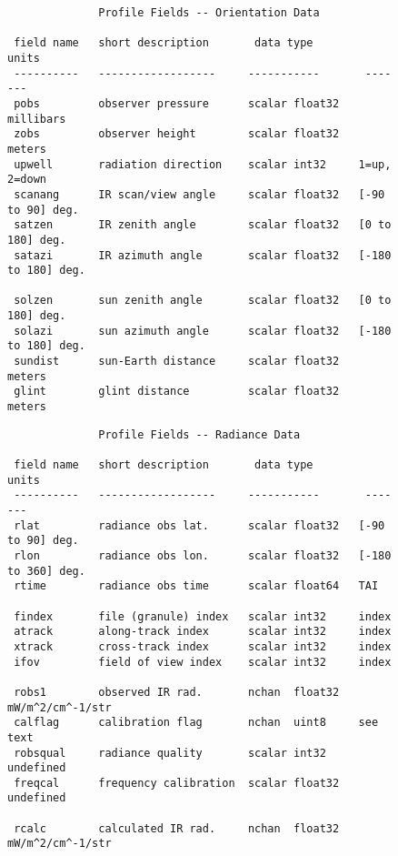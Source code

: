 \documentclass[11pt]{article}
\begin{document}
\begin{figure}
{\footnotesize
\begin{verbatim}
              Profile Fields -- Orientation Data
  
 field name   short description       data type         units
 ----------   ------------------     -----------       -------
 pobs         observer pressure      scalar float32   millibars
 zobs         observer height        scalar float32   meters
 upwell       radiation direction    scalar int32     1=up, 2=down
 scanang      IR scan/view angle     scalar float32   [-90 to 90] deg.
 satzen       IR zenith angle        scalar float32   [0 to 180] deg.
 satazi       IR azimuth angle       scalar float32   [-180 to 180] deg.

 solzen       sun zenith angle       scalar float32   [0 to 180] deg.
 solazi       sun azimuth angle      scalar float32   [-180 to 180] deg.
 sundist      sun-Earth distance     scalar float32   meters
 glint        glint distance         scalar float32   meters

\end{verbatim}
}
\end{figure}
\begin{figure}
{\footnotesize
\begin{verbatim}
              Profile Fields -- Radiance Data
  
 field name   short description       data type         units
 ----------   ------------------     -----------       -------
 rlat         radiance obs lat.      scalar float32   [-90 to 90] deg.
 rlon         radiance obs lon.      scalar float32   [-180 to 360] deg. 
 rtime        radiance obs time      scalar float64   TAI

 findex       file (granule) index   scalar int32     index
 atrack       along-track index      scalar int32     index
 xtrack       cross-track index      scalar int32     index
 ifov         field of view index    scalar int32     index

 robs1        observed IR rad.       nchan  float32   mW/m^2/cm^-1/str
 calflag      calibration flag       nchan  uint8     see text
 robsqual     radiance quality       scalar int32     undefined
 freqcal      frequency calibration  scalar float32   undefined

 rcalc        calculated IR rad.     nchan  float32   mW/m^2/cm^-1/str

\end{verbatim}
}
\end{figure}
\end{document}
